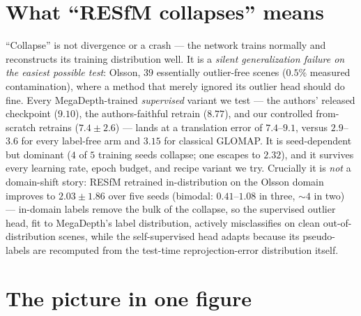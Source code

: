 \documentclass[11pt]{article}
\begin{document}
\section*{What ``RESfM collapses'' means}

``Collapse'' is not divergence or a crash --- the network trains normally and
reconstructs its training distribution well. It is a \emph{silent generalization
failure on the easiest possible test}: Olsson, $39$ essentially outlier-free scenes
($0.5\%$ measured contamination), where a method that merely ignored its outlier head
should do fine. Every MegaDepth-trained \emph{supervised} variant we test --- the
authors' released checkpoint ($9.10$), the authors-faithful retrain ($8.77$), and our
controlled from-scratch retrains ($7.4\pm2.6$) --- lands at a translation error of
$7.4$--$9.1$, versus $2.9$--$3.6$ for every label-free arm and $3.15$ for classical
GLOMAP. It is seed-dependent but dominant ($4$ of $5$ training seeds collapse; one
escapes to $2.32$), and it survives every learning rate, epoch budget, and recipe
variant we try. Crucially it is \emph{not} a domain-shift story: RESfM retrained
in-distribution on the Olsson domain improves to $2.03\pm1.86$ over five seeds
(bimodal: $0.41$--$1.08$ in three, ${\sim}4$ in two) --- in-domain labels remove the
bulk of the collapse, so the supervised outlier
head, fit to MegaDepth's label distribution, actively misclassifies on clean
out-of-distribution scenes, while the self-supervised head adapts because its
pseudo-labels are recomputed from the test-time reprojection-error distribution itself.

\section*{The picture in one figure}
\end{document}
